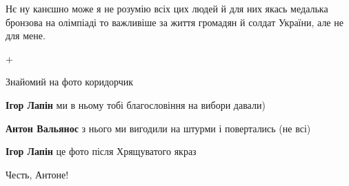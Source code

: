 \begin{itemize}
Нє ну канєшно може я не розумію всіх цих людей й для них якась медалька
бронзова на олімпіаді то важливіше за життя громадян й солдат України, але не
для мене.


 

+

 

Знайомий на фото коридорчик

\begin{itemize}
 
\textbf{Ігор Лапін} ми в ньому тобі благословіння на вибори давали)

 

\textbf{Антон Вальянос} з нього ми вигодили на штурми і повертались (не всі)

 
\textbf{Ігор Лапін} це фото після Хрящуватого якраз
\end{itemize}

 
Честь, Антоне!


\end{itemize}
